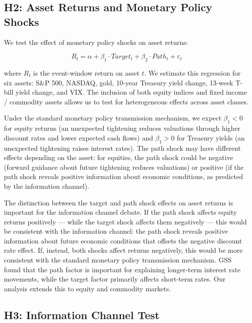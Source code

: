 \documentclass[12pt]{article}
\begin{document}
\subsection{H2: Asset Returns and Monetary Policy Shocks}

We test the effect of monetary policy shocks on asset returns:

\begin{equation}
\label{eq:h2}
R_t = \alpha + \beta_1 \cdot Target_t + \beta_2 \cdot Path_t + \varepsilon_t
\end{equation}

where $R_t$ is the event-window return on asset $t$. We estimate this regression for six assets: S\&P 500, NASDAQ, gold, 10-year Treasury yield change, 13-week T-bill yield change, and VIX. The inclusion of both equity indices and fixed income / commodity assets allows us to test for heterogeneous effects across asset classes.

Under the standard monetary policy transmission mechanism, we expect $\beta_1 < 0$ for equity returns (an unexpected tightening reduces valuations through higher discount rates and lower expected cash flows) and $\beta_1 > 0$ for Treasury yields (an unexpected tightening raises interest rates). The path shock may have different effects depending on the asset: for equities, the path shock could be negative (forward guidance about future tightening reduces valuations) or positive (if the path shock reveals positive information about economic conditions, as predicted by the information channel).

The distinction between the target and path shock effects on asset returns is important for the information channel debate. If the path shock affects equity returns positively --- while the target shock affects them negatively --- this would be consistent with the information channel: the path shock reveals positive information about future economic conditions that offsets the negative discount rate effect. If, instead, both shocks affect returns negatively, this would be more consistent with the standard monetary policy transmission mechanism. GSS found that the path factor is important for explaining longer-term interest rate movements, while the target factor primarily affects short-term rates. Our analysis extends this to equity and commodity markets.

\subsection{H3: Information Channel Test}
\end{document}
